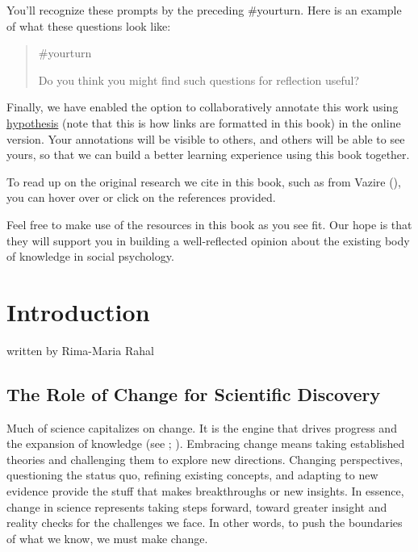 \documentclass[
  letterpaper,
]{book}
\begin{document}
You'll recognize these prompts by the preceding {\#yourturn.} Here is an
example of what these questions look like:

\begin{quote}
{\#yourturn}

Do you think you might find such questions for reflection useful?
\end{quote}

Finally, we have enabled the option to collaboratively annotate this
work using \href{https://web.hypothes.is/}{hypothesis} (note that this
is how links are formatted in this book) in the online version. Your
annotations will be visible to others, and others will be able to see
yours, so that we can build a better learning experience using this book
together.

To read up on the original research we cite in this book, such as from
Vazire (), you can hover over or click on
the references provided.

Feel free to make use of the resources in this book as you see fit. Our
hope is that they will support you in building a well-reflected opinion
about the existing body of knowledge in social psychology.


\chapter*{\texorpdfstring{{Introduction}}{Introduction}}\label{introduction}


{written by Rima-Maria Rahal}

\section*{The Role of Change for Scientific
Discovery}\label{the-role-of-change-for-scientific-discovery}


Much of science capitalizes on change. It is the engine that drives
progress and the expansion of knowledge (see
;
). Embracing change means
taking established theories and challenging them to explore new
directions. Changing perspectives, questioning the status quo, refining
existing concepts, and adapting to new evidence provide the stuff that
makes breakthroughs or new insights. In essence, change in science
represents taking steps forward, toward greater insight and reality
checks for the challenges we face. In other words, to push the
boundaries of what we know, we must make change.
\end{document}
